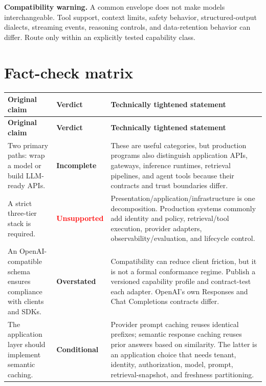 \documentclass[10pt]{article}
\newcommand{\verdict}[2]{\textcolor{#1}{\sffamily\bfseries #2}}
\begin{document}
\begin{warningbox}
\textbf{Compatibility warning.} A common envelope does not make models interchangeable. Tool support, context limits, safety behavior, structured-output dialects, streaming events, reasoning controls, and data-retention behavior can differ. Route only within an explicitly tested capability class.
\end{warningbox}

\section{Fact-check matrix}

\small
\begin{longtable}{P{0.27\textwidth} P{0.12\textwidth} P{0.53\textwidth}}
\toprule
\textbf{Original claim} & \textbf{Verdict} & \textbf{Technically tightened statement} \\
\midrule
\endfirsthead
\toprule
\textbf{Original claim} & \textbf{Verdict} & \textbf{Technically tightened statement} \\
\midrule
\endhead
Two primary paths: wrap a model or build LLM-ready APIs. & \verdict{amber}{Incomplete} & These are useful categories, but production programs also distinguish application APIs, gateways, inference runtimes, retrieval pipelines, and agent tools because their contracts and trust boundaries differ. \\
\addlinespace
A strict three-tier stack is required. & \verdict{red}{Unsupported} & Presentation/application/infrastructure is one decomposition. Production systems commonly add identity and policy, retrieval/tool execution, provider adapters, observability/evaluation, and lifecycle control. \\
\addlinespace
An OpenAI-compatible schema ensures compliance with clients and SDKs. & \verdict{amber}{Overstated} & Compatibility can reduce client friction, but it is not a formal conformance regime. Publish a versioned capability profile and contract-test each adapter. OpenAI's own Responses and Chat Completions contracts differ.\cite{openai-migrate} \\
\addlinespace
The application layer should implement semantic caching. & \verdict{amber}{Conditional} & Provider prompt caching reuses identical prefixes; semantic response caching reuses prior answers based on similarity. The latter is an application choice that needs tenant, identity, authorization, model, prompt, retrieval-snapshot, and freshness partitioning.\cite{openai-cache} \\

\end{longtable}
\end{document}
